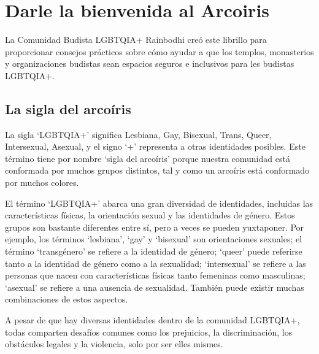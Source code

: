 \documentclass[12pt,openany]{book}
\begin{document}
\chapter*{Darle la bienvenida al Arcoiris}

\begin{figure}
\end{figure}
La Comunidad Budista LGBTQIA+ Rainbodhi creó este librillo para proporcionar consejos prácticos sobre cómo ayudar a que los templos, monasterios y organizaciones budistas sean espacios seguros e inclusivos para les budistas LGBTQIA+.

\section*{La sigla del arcoíris}

La sigla `LGBTQIA+' significa Lesbiana, Gay, Bisexual, Trans, Queer, Intersexual, Asexual, y el signo `+' representa a otras identidades posibles. Este término tiene por nombre `sigla del arcoíris' porque nuestra comunidad está conformada por muchos grupos distintos, tal y como un arcoíris está conformado por muchos colores.

El término `LGBTQIA+' abarca una gran diversidad de identidades, incluidas las características físicas, la orientación sexual y las identidades de género. Estos grupos son bastante diferentes entre sí, pero a veces se pueden yuxtaponer. Por ejemplo, los términos `lesbiana', `gay' y `bisexual' son orientaciones sexuales; el término `transgénero' se refiere a la identidad de género; `queer' puede referirse tanto a la identidad de género como a la sexualidad; `intersexual' se refiere a las personas que nacen con características físicas tanto femeninas como masculinas; `asexual' se refiere a una ausencia de sexualidad. También puede existir muchas combinaciones de estos aspectos.

A pesar de que hay diversas identidades dentro de la comunidad LGBTQIA+, todas comparten desafíos comunes como los prejuicios, la discriminación, los obstáculos legales y la violencia, solo por ser elles mismes.
\end{document}
